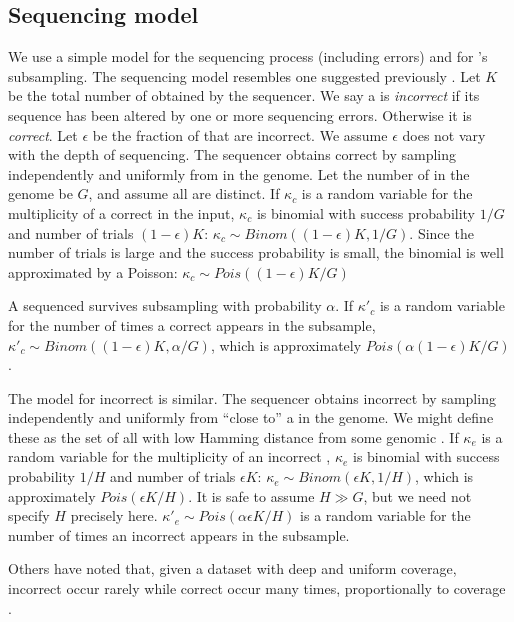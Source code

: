 \documentclass[10pt]{article}
\begin{document}
\subsection*{Sequencing model}
We use a simple model for the sequencing process (including errors) and for \tool's subsampling.  The sequencing model resembles one suggested previously \cite{melsted2014kmerstream}.  Let $K$ be the total number of \kmers obtained by the sequencer.  We say a \kmer is \emph{incorrect} if its sequence has been altered by one or more sequencing errors.  Otherwise it is \emph{correct}.  Let $\epsilon$ be the fraction of \kmers that are incorrect.  We assume $\epsilon$ does not vary with the depth of sequencing.  The sequencer obtains correct \kmers by sampling independently and uniformly from \kmers in the genome.  Let the number of \kmers in the genome be $G$, and assume all are distinct.  If $\kappa_c$ is a random variable for the multiplicity of a correct \kmer in the input, $\kappa_c$ is binomial with success probability $1/G$ and number of trials $(1-\epsilon)K$: $\kappa_c \sim Binom((1-\epsilon)K, 1/G)$.  Since the number of trials is large and the success probability is small, the binomial is well approximated by a Poisson: $\kappa_c \sim Pois((1-\epsilon)K/G)$

A sequenced \kmer survives subsampling with probability $\alpha$.  If $\kappa'_c$ is a random variable for the number of times a correct \kmer appears in the subsample, $\kappa'_c \sim Binom((1-\epsilon)K, \alpha/G)$, which is approximately $Pois(\alpha(1-\epsilon)K/G)$.

The model for incorrect \kmers is similar.  The sequencer obtains incorrect \kmers by sampling independently and uniformly from \kmers ``close to'' a \kmer in the genome.  We might define these as the set of all \kmers with low Hamming distance from some genomic \kmer.  If $\kappa_e$ is a random variable for the multiplicity of an incorrect \kmer, $\kappa_e$ is binomial with success probability $1/H$ and number of trials $\epsilon K$: $\kappa_e \sim Binom(\epsilon K, 1/H)$, which is approximately $Pois(\epsilon K / H)$.  It is safe to assume $H \gg G$, but we need not specify $H$ precisely here.  $\kappa'_e \sim Pois(\alpha\epsilon K / H)$ is a random variable for the number of times an incorrect \kmer appears in the subsample.

Others have noted that, given a dataset with deep and uniform coverage, incorrect \kmers occur rarely while correct \kmers occur many times, proportionally to coverage \cite{pevzner2001eulerian, chaisson2004fragment}.
\end{document}
